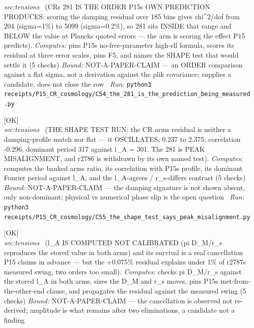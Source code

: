 \begin{description}
\textit{sec:tensions} \ (CRs 281 IS THE ORDER P15s OWN PREDICTION PRODUCES: scoring the damping residual over 185 bins gives chi\textasciicircum{}2/dof from 204 (sigma=1\%) to 5099 (sigma=0.2\%), so 281 sits INSIDE that range and BELOW the value at Plancks quoted errors --- the arm is scoring the effect P15 predicts). 
\emph{Computes:} pins P15s no-free-parameter high-ell formula, scores its residual at three error scales, pins F5, and names the SHAPE test that would settle it (5 checks)
 \emph{Bound:} NOT-A-PAPER-CLAIM --- an ORDER comparison against a flat sigma, not a derivation against the plik covariance; supplies a candidate, does not close the row
\ \emph{Run:} \texttt{python3 receipts/P15\_CR\_cosmology/C54\_the\_281\_is\_the\_prediction\_being\_measured.py}
\item[\rcptlabel{C55_the_shape_test_says_peak_misalignment}{P15R146}\textbf{P15R146}\quad\texttt{C55\_the\_shape\_test\_says\_peak\_misalignment}]\hfill\textsf{[OK]}\\
\textit{sec:tensions} \ (THE SHAPE TEST RUN: the CR arms residual is neither a damping-profile match nor flat --- it OSCILLATES, 0.237 to 2.375, correlation -0.296, dominant period 317 against l\_A = 301. The 281 is PEAK MISALIGNMENT, and r2786 is withdrawn by its own named test). 
\emph{Computes:} computes the banked arms ratio, its correlation with P15s profile, its dominant Fourier period against l\_A, and the l\_A-agrees / r\_s-differs contrast (5 checks)
 \emph{Bound:} NOT-A-PAPER-CLAIM --- the damping signature is not shown absent, only non-dominant; physical vs numerical phase slip is the open question
\ \emph{Run:} \texttt{python3 receipts/P15\_CR\_cosmology/C55\_the\_shape\_test\_says\_peak\_misalignment.py}
\item[\rcptlabel{C56_la_is_computed_and_its_residual_is_too_small}{P15R147}\textbf{P15R147}\quad\texttt{C56\_la\_is\_computed\_and\_its\_residual\_is\_too\_small}]\hfill\textsf{[OK]}\\
\textit{sec:tensions} \ (l\_A IS COMPUTED NOT CALIBRATED (pi D\_M/r\_s reproduces the stored value in both arms) and its survival is a real cancellation P15 claims in advance --- but the +0.075\% residual explains under 1\% of r2787s measured swing, two orders too small). 
\emph{Computes:} checks pi D\_M/r\_s against the stored l\_A in both arms, sizes the D\_M and r\_s moves, pins P15s met-from-the-other-end clause, and propagates the residual against the measured swing (5 checks)
 \emph{Bound:} NOT-A-PAPER-CLAIM --- the cancellation is observed not re-derived; amplitude is what remains after two eliminations, a candidate not a finding

\end{description}

